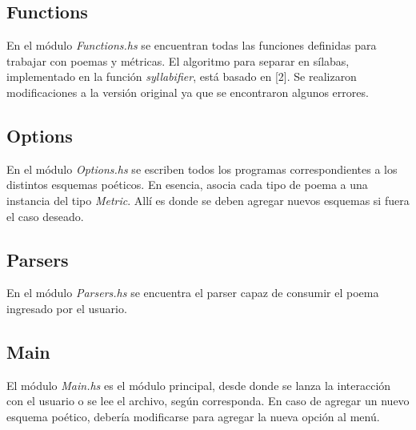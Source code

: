 \documentclass[12pt, a4paper]{article}
\begin{document}
\subsection*{Functions}
En el módulo \textit{Functions.hs} se encuentran todas las funciones definidas para trabajar con poemas y métricas. El algoritmo para separar en sílabas, implementado en la función \textit{syllabifier}, está basado en [2]. Se realizaron modificaciones a la versión original ya que se encontraron algunos errores.
\subsection*{Options}
En el módulo \textit{Options.hs} se escriben todos los programas correspondientes a los distintos esquemas poéticos. En esencia, asocia cada tipo de poema a una instancia del tipo \textit{Metric}. Allí es donde se deben agregar nuevos esquemas si fuera el caso deseado. 
\subsection*{Parsers}
En el módulo \textit{Parsers.hs} se encuentra el parser capaz de consumir el poema ingresado por el usuario.
\subsection*{Main}
El módulo \textit{Main.hs} es el módulo principal, desde donde se lanza la interacción con el usuario o se lee el archivo, según corresponda. En caso de agregar un nuevo esquema poético, debería modificarse para agregar la nueva opción al menú.
\end{document}

